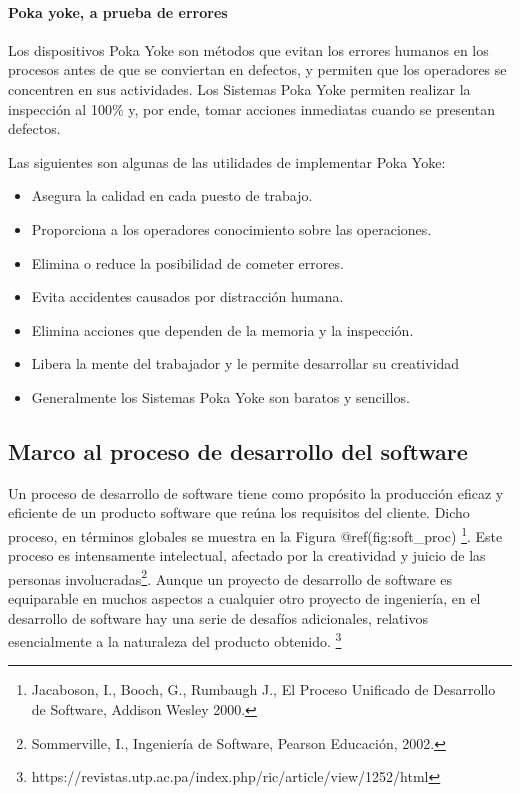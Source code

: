 \documentclass[11pt]{article}
\providecommand{\tightlist}{%
      \setlength{\itemsep}{0pt}\setlength{\parskip}{0pt}}
\begin{document}
\hypertarget{poka-yoke-a-prueba-de-errores}{%
\paragraph{Poka yoke, a prueba de
errores}\label{poka-yoke-a-prueba-de-errores}}

Los dispositivos Poka Yoke son métodos que evitan los errores humanos en
los procesos antes de que se conviertan en defectos, y permiten que los
operadores se concentren en sus actividades. Los Sistemas Poka Yoke
permiten realizar la inspección al 100\% y, por ende, tomar acciones
inmediatas cuando se presentan defectos.

Las siguientes son algunas de las utilidades de implementar Poka Yoke:

\begin{itemize}
\tightlist
\item
  Asegura la calidad en cada puesto de trabajo.
\item
  Proporciona a los operadores conocimiento sobre las operaciones.
\item
  Elimina o reduce la posibilidad de cometer errores.
\item
  Evita accidentes causados por distracción humana.
\item
  Elimina acciones que dependen de la memoria y la inspección.
\item
  Libera la mente del trabajador y le permite desarrollar su creatividad
\item
  Generalmente los Sistemas Poka Yoke son baratos y sencillos.
\end{itemize}

\hypertarget{marco-al-proceso-de-desarrollo-del-software}{%
\subsection{Marco al proceso de desarrollo del
software}\label{marco-al-proceso-de-desarrollo-del-software}}

Un proceso de desarrollo de software tiene como propósito la producción
eficaz y eficiente de un producto software que reúna los requisitos del
cliente. Dicho proceso, en términos globales se muestra en la Figura
@ref(fig:soft\_proc) \footnote{Jacaboson, I., Booch, G., Rumbaugh J., El
  Proceso Unificado de Desarrollo de Software, Addison Wesley 2000.}.
Este proceso es intensamente intelectual, afectado por la creatividad y
juicio de las personas involucradas\footnote{Sommerville, I., Ingeniería
  de Software, Pearson Educación, 2002.}. Aunque un proyecto de
desarrollo de software es equiparable en muchos aspectos a cualquier
otro proyecto de ingeniería, en el desarrollo de software hay una serie
de desafíos adicionales, relativos esencialmente a la naturaleza del
producto obtenido. \footnote{https://revistas.utp.ac.pa/index.php/ric/article/view/1252/html}
\end{document}
